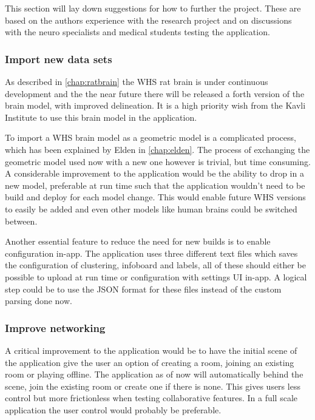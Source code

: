 





This section will lay down suggestions for how to further the project. These are based on the authors experience with the research project and on discussions with the neuro specialists and medical students testing the application.

\subsubsection*{Import new data sets}

As described in \autoref{chap:ratbrain} the WHS rat brain is under continuous development and the the near future there will be released a forth version of the brain model, with improved delineation. It is a high priority wish from the Kavli Institute to use this brain model in the application.

To import a WHS brain model as a geometric model is a complicated process, which has been explained by Elden in \autoref{chap:elden}.
The process of exchanging the geometric model used now with a new one however is trivial, but time consuming. A considerable improvement to the application would be the ability to drop in a new model, preferable at run time such that the application wouldn't need to be build and deploy for each model change.
This would enable future WHS versions to easily be added and even other models like human brains could be switched between.  

Another essential feature to reduce the need for new builds is to enable configuration in-app. The application uses three different text files which saves the configuration of clustering, infoboard and labels, all of these should either be possible to upload at run time or configuration with settings UI in-app. A logical step could be to use the JSON format for these files instead of the custom parsing done now.

\subsubsection*{Improve networking}
A critical improvement to the application would be to have the initial scene of the application give the user an option of creating a room, joining an existing room or playing offline.
The application as of now will automatically behind the scene, join the existing room or create one if there is none. This gives users less control but more frictionless when testing collaborative features. In a full scale application the user control would probably be preferable.

